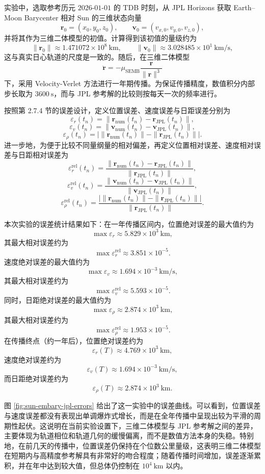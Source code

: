 实验中，选取参考历元 \(2026\text{-}01\text{-}01\) 的 TDB 时刻，从 JPL Horizons 获取 Earth--Moon Barycenter 相对 Sun 的三维状态向量
\[
\bm r_0=(x_0,y_0,z_0),\qquad
\bm v_0=(v_{x,0},v_{y,0},v_{z,0}),
\]
并将其作为三维二体模型的初值。计算得到该初值的量级约为
\[
\|\bm r_0\| \approx 1.471072\times 10^8\ \mathrm{km},
\qquad
\|\bm v_0\| \approx 3.028485\times 10^1\ \mathrm{km/s},
\]
这与真实日心轨道的尺度是一致的。随后，在三维二体模型
\[
\ddot{\bm r}
=
-\mu_{\mathrm{SEMB}}\frac{\bm r}{\|\bm r\|^3}
\]
下，采用 Velocity-Verlet 方法进行一年期传播。为保证传播精度，数值积分内部步长取为 \(3600\ \mathrm{s}\)，而与 JPL 参考解的比较则按每天一次的频率进行。

按照第 2.7.4 节的误差设计，定义位置误差、速度误差与日距误差分别为
\[
\varepsilon_r(t_n)=\|\bm r_{\mathrm{num}}(t_n)-\bm r_{\mathrm{JPL}}(t_n)\|,
\]
\[
\varepsilon_v(t_n)=\|\bm v_{\mathrm{num}}(t_n)-\bm v_{\mathrm{JPL}}(t_n)\|,
\]
\[
\varepsilon_\rho(t_n)=\bigl|\|\bm r_{\mathrm{num}}(t_n)\|-\|\bm r_{\mathrm{JPL}}(t_n)\|\bigr|.
\]
进一步地，为便于比较不同量纲量的相对偏差，再定义位置相对误差、速度相对误差与日距相对误差为
\[
\varepsilon_r^{\mathrm{rel}}(t_n)
=
\frac{\|\bm r_{\mathrm{num}}(t_n)-\bm r_{\mathrm{JPL}}(t_n)\|}{\|\bm r_{\mathrm{JPL}}(t_n)\|},
\]
\[
\varepsilon_v^{\mathrm{rel}}(t_n)
=
\frac{\|\bm v_{\mathrm{num}}(t_n)-\bm v_{\mathrm{JPL}}(t_n)\|}{\|\bm v_{\mathrm{JPL}}(t_n)\|},
\]
\[
\varepsilon_\rho^{\mathrm{rel}}(t_n)
=
\frac{\bigl|\|\bm r_{\mathrm{num}}(t_n)\|-\|\bm r_{\mathrm{JPL}}(t_n)\|\bigr|}{\|\bm r_{\mathrm{JPL}}(t_n)\|}.
\]

本次实验的误差统计结果如下：在一年传播区间内，位置绝对误差的最大值约为
\[
\max \varepsilon_r \approx 5.829\times 10^3\ \mathrm{km},
\]
其最大相对误差约为
\[
\max \varepsilon_r^{\mathrm{rel}} \approx 3.851\times 10^{-5}.
\]
速度绝对误差的最大值约为
\[
\max \varepsilon_v \approx 1.694\times 10^{-3}\ \mathrm{km/s},
\]
其最大相对误差约为
\[
\max \varepsilon_v^{\mathrm{rel}} \approx 5.593\times 10^{-5}.
\]
同时，日距绝对误差的最大值约为
\[
\max \varepsilon_\rho \approx 2.874\times 10^3\ \mathrm{km},
\]
其最大相对误差约为
\[
\max \varepsilon_\rho^{\mathrm{rel}} \approx 1.953\times 10^{-5}.
\]
在传播终点（约一年后），位置绝对误差约为
\[
\varepsilon_r(T)\approx 4.769\times 10^3\ \mathrm{km},
\]
速度绝对误差约为
\[
\varepsilon_v(T)\approx 1.694\times 10^{-3}\ \mathrm{km/s},
\]
而日距绝对误差约为
\[
\varepsilon_\rho(T)\approx 2.874\times 10^3\ \mathrm{km}.
\]

图 \ref{fig:sun-embary-jpl-errors} 给出了这一实验中的误差曲线。可以看到，位置误差与速度误差都没有表现出单调爆炸式增长，而是在全年传播中呈现出较为平滑的周期性起伏。这说明在当前实验设置下，三维二体模型与 JPL 参考解之间的差异，主要体现为轨道相位和轨道几何的缓慢偏离，而不是数值方法本身的失稳。特别地，在前几天的传播中，位置误差仍保持在个位数公里量级，这表明三维二体模型在短期内与高精度参考解具有非常好的吻合程度；随着传播时间增加，误差逐渐累积，并在年中达到较大值，但总体仍控制在 \(10^4\ \mathrm{km}\) 以内。

